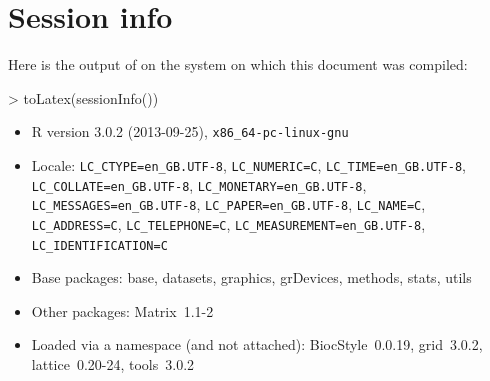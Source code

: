 \documentclass{article}
\begin{document}


\section{Session info}
Here is the output of  on the system on which
this document was compiled:
\begin{Schunk}
\begin{Sinput}
> toLatex(sessionInfo())
\end{Sinput}
\begin{itemize}\raggedright
  \item R version 3.0.2 (2013-09-25), \verb|x86_64-pc-linux-gnu|
  \item Locale: \verb|LC_CTYPE=en_GB.UTF-8|, \verb|LC_NUMERIC=C|, \verb|LC_TIME=en_GB.UTF-8|, \verb|LC_COLLATE=en_GB.UTF-8|, \verb|LC_MONETARY=en_GB.UTF-8|, \verb|LC_MESSAGES=en_GB.UTF-8|, \verb|LC_PAPER=en_GB.UTF-8|, \verb|LC_NAME=C|, \verb|LC_ADDRESS=C|, \verb|LC_TELEPHONE=C|, \verb|LC_MEASUREMENT=en_GB.UTF-8|, \verb|LC_IDENTIFICATION=C|
  \item Base packages: base, datasets, graphics, grDevices, methods, stats,
    utils
  \item Other packages: Matrix~1.1-2
  \item Loaded via a namespace (and not attached): BiocStyle~0.0.19, grid~3.0.2,
    lattice~0.20-24, tools~3.0.2
\end{itemize}\end{Schunk}


%
%



\end{document}
